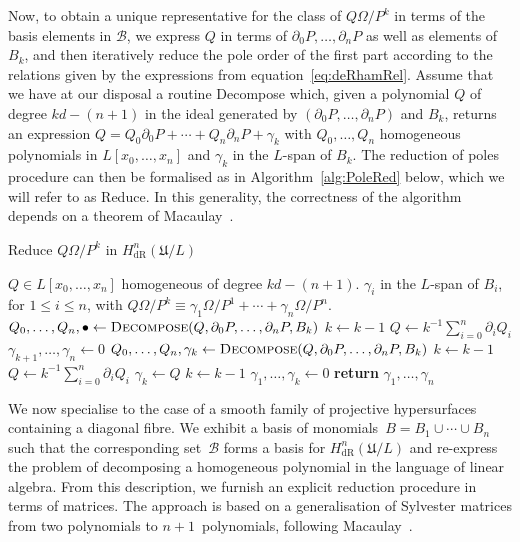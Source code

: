 \documentclass[a4paper,11pt]{article}
\numberwithin{equation}{section}
\providecommand{\HdR}{H_{\text{dR}}}    %
\providecommand{\cB}{\mathcal{B}} %
\theoremstyle{definition}
\begin{document}
Now, to obtain a unique representative for the class of $Q \Omega / P^k$ 
in terms of the basis elements in $\cB$, we express $Q$ in terms of 
$\partial_0 P, \dotsc, \partial_n P$ as well as elements of $B_k$, and 
then iteratively reduce the pole order of the first part according to 
the relations given by the expressions from equation~\eqref{eq:deRhamRel}. 
Assume that we have at our disposal a routine {\sc Decompose} which, 
given a polynomial $Q$ of degree $kd - (n+1)$ in the ideal generated by 
$(\partial_0 P, \dotsc, \partial_n P)$ and $B_k$, returns an expression 
$Q = Q_0 \partial_0 P + \dotsb + Q_n \partial_n P + \gamma_k$ with 
$Q_0, \dotsc, Q_n$ homogeneous polynomials in $L[x_0, \dotsc, x_n]$ and 
$\gamma_k$ in the $L$-span of $B_k$.  The reduction of poles procedure can 
then be formalised as in Algorithm~\ref{alg:PoleRed} below, which we will 
refer to as {\sc Reduce}.  In this generality, the correctness of the 
algorithm depends on a theorem of Macaulay~\citep[\S 4, (4.11)]{Griffiths1969}.

\begin{algorithm}
\caption{Reduce $Q \Omega / P^k$ in $\HdR^n(\mathfrak{U}/L)$}
\label{alg:PoleRed}
\begin{algorithmic}
\vspace{1mm}
\Require $Q \in L[x_0, \dotsc, x_n]$ homogeneous of degree $kd - (n+1)$.
\Ensure  $\gamma_i$ in the $L$-span of $B_i$, for $1 \leq i \leq n$, with  
         $Q \Omega / P^k \equiv \gamma_{1} \Omega / P^{1} + \dotsb + \gamma_n \Omega / P^n$.
\State $Q_0, \dotsc, Q_n, \bullet \gets \Call{Decompose}{Q, \partial_0 P, \dotsc, \partial_n P, B_k}$
\State $k \gets k-1$
\State $Q \gets k^{-1} \sum_{i=0}^n \partial_i Q_i$
\EndWhile
\State $\gamma_{k+1}, \dotsc, \gamma_{n} \gets 0$
\State $Q_0, \dotsc, Q_n, \gamma_k \gets \Call{Decompose}{Q, \partial_0 P, \dotsc, \partial_n P, B_k}$
\State $k \gets k-1$
\State $Q \gets k^{-1} \sum_{i=0}^n \partial_i Q_i$
\EndWhile
{}
\State $\gamma_{k} \gets Q$
\State $k \gets k-1$
\EndIf
\State $\gamma_{1}, \dotsc, \gamma_{k} \gets 0$
\State \textbf{return} $\gamma_{1}, \dotsc, \gamma_n$
\EndProcedure
\end{algorithmic}
\end{algorithm}

We now specialise to the case of a smooth family of projective 
hypersurfaces containing a diagonal fibre.  We exhibit a basis 
of monomials~$B = B_1 \cup \dotsb \cup B_n$ such that the 
corresponding set~$\cB$ forms a basis for $\HdR^n(\mathfrak{U}/L)$ 
and re-express the problem of decomposing a homogeneous polynomial 
in the language of linear algebra.  From this description, we furnish 
an explicit reduction procedure in terms of matrices.  The approach 
is based on a generalisation of Sylvester matrices from two 
polynomials to $n+1$~polynomials, following Macaulay~\citep{Macaulay1994}.
\end{document}
